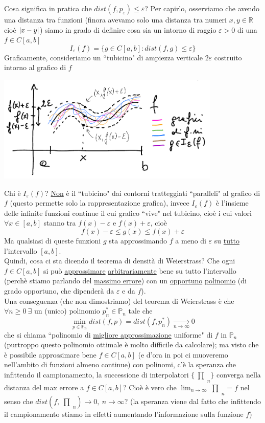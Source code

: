 \documentclass[12pt,headings=optiontohead]{article}
\DeclarePairedDelimiter{\abs}{\lvert}{\rvert}
\newcommand{\inter}{\begin{matrix}\prod\end{matrix}}
\begin{document}
Cosa significa in pratica che $dist(f,p_{\varepsilon}) \le \varepsilon$? Per capirlo, osserviamo che avendo una distanza tra funzioni (finora avevamo solo una distanza tra numeri $x,y \in \mathbb{R}$ cioè $\abs{x-y}$) siamo in grado di definire cosa sia un intorno
di raggio $\varepsilon >0$ di una $f\in C[a,b]$
\[ I_{\varepsilon}(f) = \{g \in C[a,b] : dist(f,g) \le \varepsilon\} \]
Graficamente, consideriamo un ``tubicino" di ampiezza verticale $2\varepsilon$ costruito intorno al grafico di $f$
\begin{center}
    \includegraphics[width=0.8\textwidth]{lez12_img3.png}
\end{center}
Chi è $I_{\varepsilon}(f)$? \uline{Non} è il ``tubicino" dai contorni tratteggiati ``paralleli" al grafico di $f$ (questo permette solo
la rappresentazione grafica), invece $I_{\varepsilon}(f)$ è l'insieme delle infinite funzioni continue il cui grafico ``vive" nel tubicino, cioè i cui valori $\forall x \in [a,b]$ stanno tra $f(x)-\varepsilon$ e $f(x)+\varepsilon$, cioè 
\[ f(x)-\varepsilon \le g(x) \le f(x)+\varepsilon \]
Ma qualsiasi di queste funzioni $g$ sta approssimando $f$ a meno di $\varepsilon$ su \uline{tutto} l'intervallo $[a,b]$.\\
Quindi, cosa ci sta dicendo il teorema di densità di Weierstrass? Che ogni $f \in C[a,b]$ si può \uline{approssimare} \uline{arbitrariamente} bene
su tutto l'intervallo (perchè stiamo parlando del \uline{massimo errore}) con un \uline{opportuno} \uline{polinomio} (di grado opportuno, che dipenderà da $\varepsilon$ e da $f$).\\
Una conseguenza (che non dimostriamo) del teorema di Weierstrass è che $\forall n\ge0\ \exists$ un (unico) polinomio $p_n^* \in \mathbb{P}_n$ tale che
\[ \min_{p \in \mathbb{P}_n} dist(f,p) = dist(f,p_n^*) \underset{n \to \infty}{\longrightarrow} 0 \]
che si chiama ``polinomio di \uline{migliore approssimazione} uniforme" di $f$ in $\mathbb{P}_n$ (purtroppo questo polinomio ottimale è molto difficile da calcolare); ma visto che è possibile approssimare bene $f \in C[a,b]$ (e d'ora in poi ci muoveremo nell'ambito di funzioni almeno continue) con polinomi, c'è la speranza che infittendo il campionamento, la successione di interpolatori $\{\inter_n\}$ converga nella distanza del max errore a $f \in C[a,b]$? Cioè è vero che $\lim_{n \to \infty} \inter_n = f$ nel senso che $dist(f,\inter_n) \to 0,\ n \to \infty$? (la speranza viene dal fatto che infittendo il campionamento stiamo in effetti aumentando l'informazione sulla funzione $f$)\\
\end{document}
